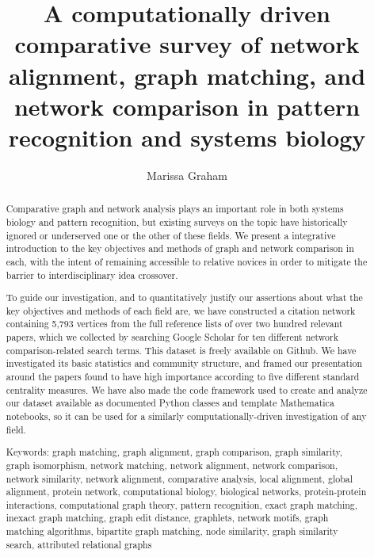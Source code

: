 \documentclass[12pt]{thesis}
\author{Marissa Graham}
\title{A computationally driven comparative survey of network alignment, graph matching, and network comparison in pattern recognition and systems biology}
\theoremstyle{plain}
\theoremstyle{definition}
\theoremstyle{remark}
\begin{document}








\frontmatter 
\maketitle 

\begin{abstract}

Comparative graph and network analysis plays an important role in both systems biology and pattern recognition, but existing surveys on the topic have historically ignored or underserved one or the other of these fields. We present a integrative introduction to the key objectives and methods of graph and network comparison in each, with the intent of remaining accessible to relative novices in order to mitigate the barrier to interdisciplinary idea crossover. 

To guide our investigation, and to quantitatively justify our assertions about what the key objectives and methods of each field are, we have constructed a citation network containing 5,793 vertices from the full reference lists of over two hundred relevant papers, which we collected by searching Google Scholar for ten different network comparison-related search terms. This dataset is freely available on Github. We have investigated its basic statistics and community structure, and framed our presentation around the papers found to have high importance according to five different standard centrality measures. We have also made the code framework used to create and analyze our dataset available as documented Python classes and template Mathematica notebooks, so it can be used for a similarly computationally-driven investigation of any field.

\vskip 2.25in
 
\noindent Keywords: %
graph matching, graph alignment, graph comparison, graph similarity, graph isomorphism, network matching, network alignment, network comparison, network similarity, network alignment, comparative analysis, local alignment, global alignment, protein network, computational biology, biological networks, protein-protein interactions, computational graph theory, pattern recognition, exact graph matching, inexact graph matching, graph edit distance, graphlets, network motifs, graph matching algorithms, bipartite graph matching, node similarity, graph similarity search, attributed relational graphs
\end{abstract}
\end{document}
